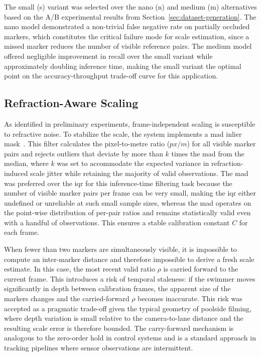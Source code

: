 The small (s) variant was selected over the nano (n) and medium (m) alternatives
based on the A/B experimental results from Section~\ref{sec:dataset-generation}. The nano
model demonstrated a non-trivial false negative rate on partially occluded markers, which
constitutes the critical failure mode for scale estimation, since a missed marker reduces the
number of visible reference pairs. The medium model offered negligible improvement in recall
over the small variant while approximately doubling inference time, making the small variant
the optimal point on the accuracy-throughput trade-off curve for this application.

\subsection{Refraction-Aware Scaling}

As identified in preliminary experiments, frame-independent scaling is susceptible to
refractive noise. To stabilize the scale, the system implements a \gls{mad} inlier mask~\cite{leys2013detecting}. This filter calculates the pixel-to-metre ratio
($px/m$) for all visible marker pairs and rejects outliers that deviate by more than $k$ times
the \gls{mad} from the median, where $k$ was set to accommodate the expected variance in
refraction-induced scale jitter while retaining the majority of valid observations. The \gls{mad}
was preferred over the \gls{iqr} for this inference-time filtering task because the number of visible
marker pairs per frame can be very small, making the \gls{iqr} either
undefined or unreliable at such small sample sizes, whereas the \gls{mad} operates on the
point-wise distribution of per-pair ratios and remains statistically valid even with a handful
of observations. This ensures a stable calibration constant $C$ for each frame.

When fewer than two markers are simultaneously visible, it is impossible to compute an
inter-marker distance and therefore impossible to derive a fresh scale estimate. In this case,
the most recent valid ratio $\rho$ is carried forward to the current frame. This introduces a
risk of temporal staleness: if the swimmer moves significantly in depth between calibration
frames, the apparent size of the markers changes and the carried-forward $\rho$ becomes
inaccurate. This risk was accepted as a pragmatic trade-off given the typical geometry of
poolside filming, where depth variation is small relative to the camera-to-lane distance and
the resulting scale error is therefore bounded. The carry-forward mechanism is analogous to the
zero-order hold in control systems and is a standard approach in tracking pipelines where
sensor observations are intermittent.

